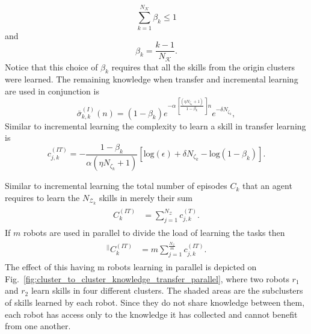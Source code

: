 \begin{equation}
	\sum\limits_{k=1}^{N_\mathcal{K}}\beta_{k} \leq 1
\end{equation}
and
\begin{equation}
	\beta_{k}= \frac{k-1}{N_\mathcal{K}}.
\end{equation}
Notice that this choice of $\beta_k$ requires that all the skills from the origin clusters were learned. The remaining knowledge when transfer and incremental learning are used in conjunction is
\begin{equation*}\label{eq:remaining_knowledge__ITL}
	\bar{\sigma}^{(I)}_{k,k}(n) = \left(1- \beta_k\right) e^{-\alpha  \left[\frac{ \left(\eta N_{\zeta_k}+1\right)}{1 - \beta_k}\right] n} e^{-\delta N_{\zeta_k}},
\end{equation*}
Similar to incremental learning the complexity to learn a skill in transfer learning is
\begin{equation}\label{eq:skill_complexity_TL}
	c^{(IT)}_{j,k} = -\frac{1 - \beta_{k}}{\alpha (\eta N_{\zeta_k}+ 1)}\left[\text{log}(\epsilon) + \delta N_{\zeta_k} - \text{log}(1 - \beta_{k})\right].
\end{equation}

Similar to incremental learning the total number of episodes  $ C_k $ that an agent requires to learn the $N_{\mathcal{Z}_k}$ skills in	 merely their sum
\begin{align}\label{eq:total_episodes_transfer}
	\begin{split}
		C^{(IT)}_k &= \sum^{N_{\mathcal{Z}}}_{j=1} c^{(T)}_{j,k}.
	\end{split}
\end{align}
If $m$ robots are used in parallel to divide the load of learning the tasks then
\begin{align}
	\begin{split}
		{}^{\lvert \rvert}C^{(IT)}_k &= m\sum^{\frac{N_{\mathcal{Z}}}{m}}_{j=1} c^{(IT)}_{j,k}.
	\end{split}
\end{align}
The effect of this having m robots learning in parallel is depicted on Fig.~\ref{fig:cluster_to_cluster_knowledge_transfer_parallel}, where two robots $ r_1$ and $r_2$ learn skills in four different clusters. The shaded areas are the subclusters of skills learned by each robot. Since they do not share knowledge between them, each robot has access only to the knowledge it has collected and cannot benefit from one another. 


